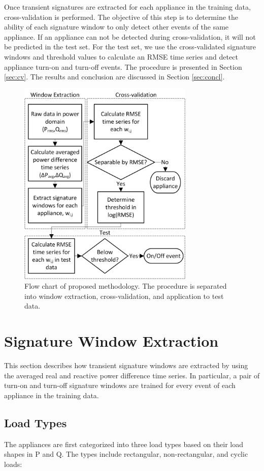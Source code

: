 \documentclass[conference]{IEEEtran}
\begin{document}
Once transient signatures are extracted for each appliance in the training data, cross-validation is performed.  The objective of this step is to determine the ability of each signature window to only detect other events of the same appliance. If an appliance can not be detected during cross-validation, it will not be predicted in the test set. For the test set, we use the cross-validated signature windows and threshold values to calculate an RMSE time series and detect appliance turn-on and turn-off events. The procedure is presented in Section \ref{sec:cv}. The results and conclusion are discussed in Section \ref{sec:concl}.  

\begin{figure}[!t]
	\centering
	\includegraphics[width=3.3in]{fig/flow.png}
	\caption{Flow chart of proposed methodology.  The procedure is separated into window extraction, cross-validation, and application to test data.}
	\label{fig:flow}
\end{figure}


\section{Signature Window Extraction}\label{sec:training}
This section describes how transient signature windows are extracted by using the averaged real and reactive power difference time series.  In particular, a pair of turn-on and turn-off signature windows are trained for every event of each appliance in the training data.  


\subsection{Load Types}
The appliances are first categorized into three load types based on their load shapes in P and Q.  The types include rectangular, non-rectangular, and cyclic loads:
\end{document}

